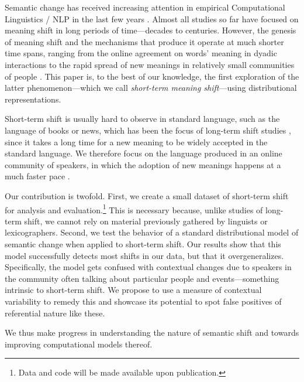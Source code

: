 Semantic change has received increasing attention in empirical Computational Linguistics / NLP in the last few years \cite{tang2018state,KutuzovEtal-coling2018}. Almost all studies so far have focused on meaning shift in long periods of time---decades to centuries. However, the genesis of meaning shift and the mechanisms that produce it operate at much shorter time spans, ranging
from the online agreement on words' meaning in dyadic interactions \cite{brennan1996conceptual} to the rapid spread of new meanings in relatively small communities of people \cite{wenger1998communities,eckert-mcconnellginet1992}.
This paper is, to the best of our knowledge, the first exploration of the latter phenomenon---which we call \textit{short-term meaning shift}---using distributional representations.

Short-term shift is usually hard to observe in standard language, such
as the language of books or news, which has been the focus of
long-term shift studies \cite[e.g.,][]{hamilton2016diachronic,kulkarni2015statistically}, since
it takes a long time for a new meaning to be widely accepted in the standard language. 
We therefore focus on the language produced in an online community of speakers, in which the 
adoption of new meanings happens at a much faster pace \cite{Clark96,hasan2009}.

Our contribution is twofold. First, we create a small dataset of short-term shift for analysis and evaluation.\footnote{Data and code will be made available upon
publication.} This is necessary because, unlike studies of long-term shift, we cannot rely on material previously gathered by linguists or lexicographers.
Second, we test the behavior of a standard distributional model of semantic change when
 applied to short-term shift. 
Our results show that this model successfully detects most shifts in our data, but that it overgeneralizes. Specifically, the model gets confused with contextual changes due to speakers in the community often talking about particular people and events---something intrinsic to short-term shift. We propose to use a measure of contextual variability to remedy this and showcase its potential to spot false positives of referential nature like these.

We thus make progress in understanding the nature of semantic shift and towards improving computational models thereof.

